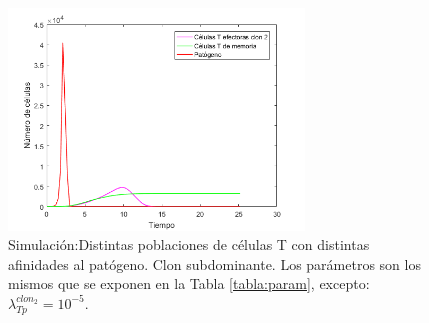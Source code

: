 \begin{figure}[t]
	\centering
	\includegraphics[width=0.7\textwidth]{Imagenes/Simulaciones/unClon}
	\caption{Simulación:Distintas poblaciones de células T con distintas afinidades al patógeno. Clon subdominante. Los parámetros son los mismos que se exponen en la Tabla \ref{tabla:param}, excepto: $\lambda_{Tp}^{clon_2} = 10^{-5}$.}
	\label{fig:unClon}
\end{figure}

